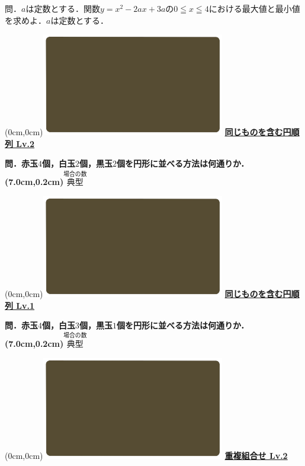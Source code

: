 \documentclass[10pt,
fleqn,
dvipdfmx,
uplatex
]{jsarticle}
\begin{document}
\Large 
問．$a$は定数とする．関数$y=x^2-2ax+3a$の$0\leqq x\leqq 4$における最大値と最小値を求めよ．$a$は定数とする．


\newpage

\at(0cm,0cm){\includegraphics[width=8cm,bb=0 0 1920 1080]{./youtube/thumbnails/templates/smart_background/場合の数.jpeg}}
{\color{orange}\bf\boldmath\Large\underline{同じものを含む円順列 Lv.2 }}\vspace{0.3zw}

\huge 
\bf\boldmath 問．赤玉$4$個，白玉$2$個，黒玉$2$個を円形に並べる方法は何通りか．
\at(7.0cm,0.2cm){\small\color{bradorange}$\overset{\text{場合の数}}{\text{典型}}$}

\newpage

\at(0cm,0cm){\includegraphics[width=8cm,bb=0 0 1920 1080]{./youtube/thumbnails/templates/smart_background/場合の数.jpeg}}
{\color{orange}\bf\boldmath\Large\underline{同じものを含む円順列 Lv.1 }}\vspace{0.3zw}

\huge 
\bf\boldmath 問．赤玉$4$個，白玉$3$個，黒玉$1$個を円形に並べる方法は何通りか．
\at(7.0cm,0.2cm){\small\color{bradorange}$\overset{\text{場合の数}}{\text{典型}}$}

\newpage

\at(0cm,0cm){\includegraphics[width=8cm,bb=0 0 1920 1080]{./youtube/thumbnails/templates/smart_background/場合の数.jpeg}}
{\color{orange}\bf\boldmath\LARGE\underline{重複組合せ Lv.2 }}\vspace{0.3zw}
\end{document}
